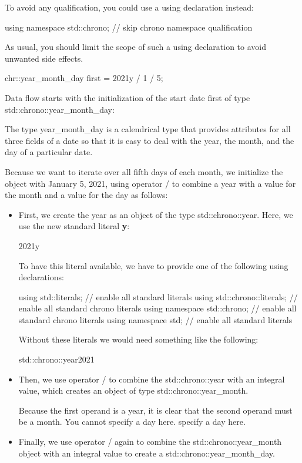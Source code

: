 To avoid any qualification, you could use a using declaration instead:

\begin{cpp}
using namespace std::chrono; // skip chrono namespace qualification
\end{cpp}

As usual, you should limit the scope of such a using declaration to avoid unwanted side effects.


\begin{cpp}
chr::year_month_day first = 2021y / 1 / 5;
\end{cpp}

Data flow starts with the initialization of the start date first of type std::chrono::year\_month\_day:

The type year\_month\_day is a calendrical type that provides attributes for all three fields of a date so that it is easy to deal with the year, the month, and the day of a particular date.

Because we want to iterate over all fifth days of each month, we initialize the object with January 5, 2021, using operator / to combine a year with a value for the month and a value for the day as follows:

\begin{itemize}
\item 
First, we create the year as an object of the type std::chrono::year. Here, we use the new standard literal \textbf{y}:

\begin{cpp}
2021y
\end{cpp}

To have this literal available, we have to provide one of the following using declarations:

\begin{cpp}
using std::literals; // enable all standard literals
using std::chrono::literals; // enable all standard chrono literals
using namespace std::chrono; // enable all standard chrono literals
using namespace std; // enable all standard literals
\end{cpp}

Without these literals we would need something like the following:

\begin{cpp}
std::chrono::year{2021}
\end{cpp}

\item
Then, we use operator / to combine the std::chrono::year with an integral value, which creates an object of type std::chrono::year\_month.

Because the first operand is a year, it is clear that the second operand must be a month. You cannot specify a day here.
specify a day here.

\item
Finally, we use operator / again to combine the std::chrono::year\_month object with an integral value to create a std::chrono::year\_month\_day.
\end{itemize}

